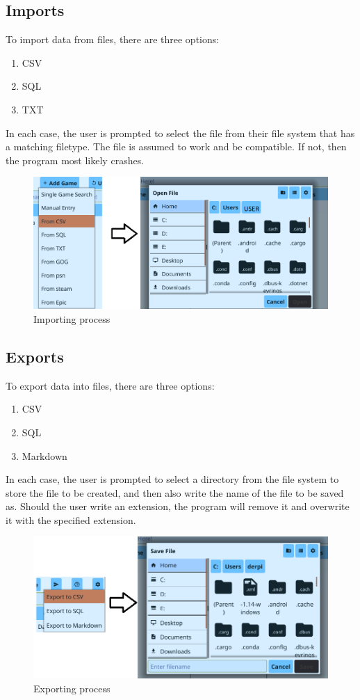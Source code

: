 \subsection{Imports}

To import data from files, there are three options:
\begin{enumerate}
	\item CSV
	\item SQL
	\item TXT
\end{enumerate}

In each case, the user is prompted to select the file from their file
system that has a matching filetype. The file is assumed to work and
be compatible. If not, then the program most likely crashes.

\begin{figure}[htb]
	\centering
	\includegraphics[width=14cm]{./Images/Import.png}
	\caption{Importing process}
	\label{fig:ImportMenu}
\end{figure}

\subsection{Exports}

To export data into files, there are three options:
\begin{enumerate}
	\item CSV
	\item SQL
	\item Markdown
\end{enumerate}

In each case, the user is prompted to select a directory from the
file system to store the file to be created, and then also write the
name of the file to be saved as. Should the user write an extension,
the program will remove it and overwrite it with the
specified extension.

\begin{figure}[htb]
	\centering
	\includegraphics[width=14cm]{./Images/Export.png}
	\caption{Exporting process}
	\label{fig:ExportMenu}
\end{figure}

